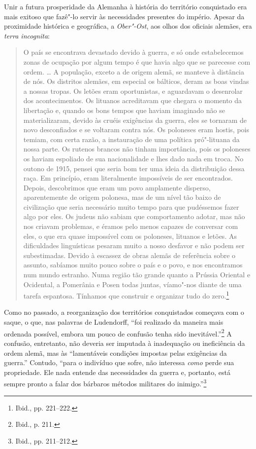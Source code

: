 Unir a futura prosperidade da Alemanha à história do território
conquistado era mais exitoso que fazê"-lo servir às necessidades
presentes do império. Apesar da proximidade histórica e geográfica, a
\textit{Ober"-Ost}, aos olhos dos oficiais alemães, era \textit{terra
incognita}:

\begin{quote}
O país se encontrava devastado devido à guerra, e só onde estabelecemos
zonas de ocupação por algum tempo é que havia algo que se parecesse com
ordem. \ldots{} A população, exceto a de origem alemã, se manteve à
distância de nós. Os distritos alemães, em especial os bálticos, deram
as boas vindas a nossas tropas. Os letões eram oportunistas, e
aguardavam o desenrolar dos acontecimentos. Os lituanos acreditavam que
chegara o momento da libertação e, quando os bons tempos que haviam
imaginado não se materializaram, devido às cruéis exigências da guerra,
eles se tornaram de novo desconfiados e se voltaram contra nós. Os
poloneses eram hostis, pois temiam, com certa razão, a instauração de
uma política pró"-lituana da nossa parte. Os rutenos brancos não tinham
importância, pois os poloneses os haviam espoliado de sua nacionalidade
e lhes dado nada em troca. No outono de 1915, pensei que seria bom ter
uma ideia da distribuição dessa raça. Em princípio, eram literalmente
impossíveis de ser encontrados. Depois, descobrimos que eram um povo
amplamente disperso, aparentemente de origem polonesa, mas de um nível
tão baixo de civilização que seria necessário muito tempo para que
pudéssemos fazer algo por eles. Os judeus não sabiam que comportamento
adotar, mas não nos criavam problemas, e éramos pelo menos capazes de
conversar com eles, o que era quase impossível com os poloneses,
lituanos e letões. As dificuldades linguísticas pesaram muito a nosso
desfavor e não podem ser subestimadas. Devido à escassez de obras alemãs
de referência sobre o assunto, sabíamos muito pouco sobre o país e o
povo, e nos encontramos num mundo estranho. Numa região tão grande
quanto a Prússia Oriental e Ocidental, a Pomerânia e Posen todas juntas,
víamo"-nos diante de uma tarefa espantosa. Tínhamos que construir e
organizar tudo do zero.\footnote{Ibid., pp. 221--222.}
\end{quote}

%

Como no passado, a reorganização dos territórios conquistados começava
com o saque, o que, nas palavras de Ludendorff, ``foi realizado da
maneira mais ordenada possível, embora um pouco de confusão tenha sido
inevitável.''\footnote{Ibid., p. 211.} A confusão, entretanto, não
deveria ser imputada à inadequação ou ineficiência da ordem alemã, mas
às ``lamentáveis condições impostas pelas exigências da guerra.''
Contudo, ``para o indivíduo que sofre, não interessa \textit{como} perde
sua propriedade. Ele nada entende das necessidades da guerra e,
portanto, está sempre pronto a falar dos bárbaros métodos militares do
inimigo.''\footnote{Ibid., pp. 211--212.}

